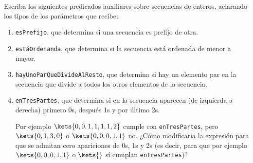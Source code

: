 \begin{enunciado}{\ejercicio}
  Escriba los siguientes predicados auxiliares sobre secuencias de enteros,
  aclarando los tipos de los parámetros que recibe:
  \begin{enumerate}[label=\alph*)]
    \item \texttt{esPrefijo}, que determina si una secuencia es prefijo de otra.

    \item \texttt{estáOrdenanda}, que determina si la secuencia está ordenada de menor a mayor.

    \item \texttt{hayUnoParQueDivideAlResto}, que determina si hay un elemento par en la secuencia
          que divide a todos los otros elementos de la secuencia.

    \item \texttt{enTresPartes}, que determina si en la secuencia aparecen (de izquierda a derecha)
          primero 0s, después 1s y por último 2s.\par
          Por ejemplo $\kets{0,0,1,1,1,1,2}$ cumple con \texttt{enTresPartes}, pero $\kets{0,1,3,0}$ o $\kets{0,0,0,1,1}$ no.
          ¿Cómo modificaría la expresión para que se admitan cero apariciones de 0s, 1s y 2s (es decir, para que por ejemplo
          $\kets{0,0,0,1,1}$ o $\kets{}$ sí cumplan \texttt{enTresPartes})?
  \end{enumerate}
\end{enunciado}

